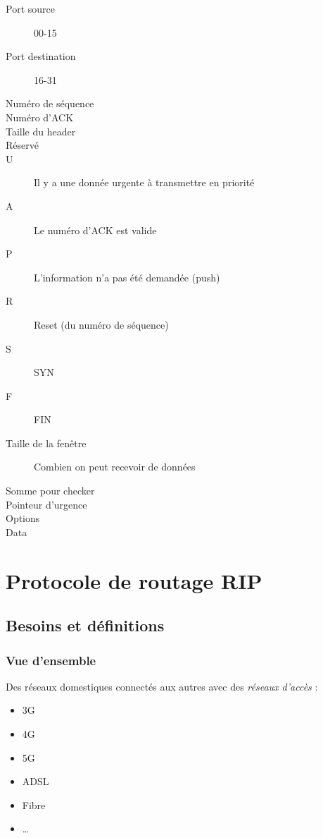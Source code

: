 \documentclass{article}
\begin{document}
\begin{description}
    \item[Port source] 00-15
    \item[Port destination] 16-31
    \item[Numéro de séquence] 
    \item[Numéro d'ACK] 
    \item[Taille du header] 
    \item[Réservé] 
    \item[U] Il y a une donnée urgente à transmettre en priorité
    \item[A] Le numéro d'ACK est valide
    \item[P] L'information n'a pas été demandée (push)
    \item[R] Reset (du numéro de séquence)
    \item[S] SYN
    \item[F] FIN
    \item[Taille de la fenêtre] Combien on peut recevoir de données
    \item[Somme pour checker] 
    \item[Pointeur d'urgence] 
    \item[Options] 
    \item[Data] 
\end{description}

\section{Protocole de routage RIP}

\subsection{Besoins et définitions}

\subsubsection{Vue d'ensemble}

Des réseaux domestiques connectés aux autres avec des \emph{réseaux d'accès} :

\begin{itemize}
    \item 3G
    \item 4G
    \item 5G
    \item ADSL
    \item Fibre
    \item \ldots
\end{itemize}
\end{document}
